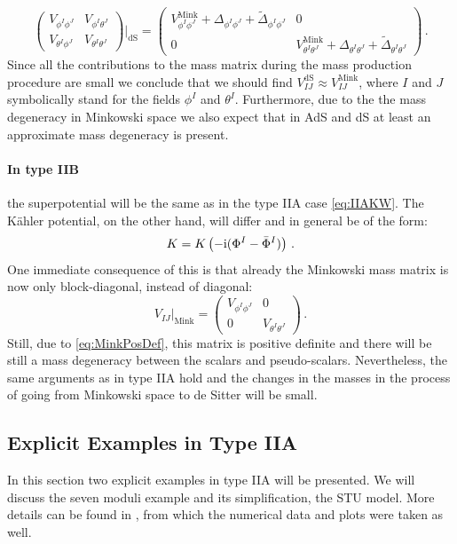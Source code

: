 \documentclass[a4paper,12pt,twoside,openright]{report}
\newcommand{\be}{\begin{equation}}
\newcommand{\ee}{\end{equation}}
\def\rmi{{\rm i}}
\begin{document}
\be 
\begin{pmatrix}
V_{\phi^I\phi^J} & V_{\phi^I \theta^J}\\
V_{\theta^I\phi^J} & V_{\theta^I \theta^J}
\end{pmatrix}\Bigg|_{\text{dS}}
=
\begin{pmatrix}
V^{\text{Mink}}_{\phi^I\phi^J} + \Delta_{\phi^I \phi^J}+ \tilde{\Delta}_{\phi^I \phi^J}& 0\\
0 & V^{\text{Mink}}_{\theta^I \theta^J}+\Delta_{\theta^I \theta^J}+\tilde{\Delta}_{\theta^I \theta^J}
\end{pmatrix}\,.
\ee
Since all the contributions to the mass matrix during the mass production procedure are small we conclude that we should find $V^{\text{dS}}_{IJ} \approx V^{\text{Mink}}_{IJ}$, where $I$ and $J$ symbolically stand for the fields $\phi^I$ and $\theta^I$. Furthermore, due to the the mass degeneracy in Minkowski space we also expect that in AdS and dS at least an approximate mass degeneracy is present.
\paragraph{In type IIB} the superpotential will be the same as in the type IIA case \eqref{eq:IIAKW}. The Kähler potential, on the other hand, will differ and in general be of the form:
\be 
K = K\left(-\rmi ( \Phi^I - \bar{\Phi}^I )\right)\,.
\ee 
One immediate consequence of this is that already the Minkowski mass matrix is now only block-diagonal, instead of diagonal:
\be 
V_{IJ}|_{\text{Mink}}=
\begin{pmatrix}
V_{\phi^I\phi^J} & 0\\
0 & V_{\theta^I \theta^J}
\end{pmatrix}\,.
\ee
Still, due to \eqref{eq:MinkPosDef}, this matrix is positive definite and there will be still a mass degeneracy between the scalars and pseudo-scalars. Nevertheless, the same arguments as in type IIA hold and the changes in the masses in the process of going from Minkowski space to de Sitter will be small.

\subsection{Explicit Examples in Type IIA}
\label{sec:massIIAexampel}
In this section two explicit examples in type IIA will be presented. We will discuss the seven moduli example and its simplification, the STU model. More details can be found in \cite{Cribiori:2019drf}, from which the numerical data and plots were taken as well.
\end{document}
